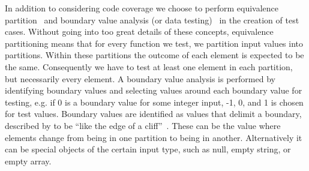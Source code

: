 In addition to considering code coverage we choose to perform equivalence partition~\cite[pp.~67-69]{Patton05} and boundary value analysis (or data testing)~\cite[pp.~70-79]{Patton05} in the creation of test cases.
Without going into too great details of these concepts, equivalence partitioning means that for every function we test, we partition input values into partitions.
Within these partitions the outcome of each element is expected to be the same.
Consequently we have to test at least one element in each partition, but necessarily every element.
A boundary value analysis is performed by identifying boundary values and selecting values around each boundary value for testing, e.g. if 0 is a boundary value for some integer input, -1, 0, and 1 is chosen for test values.
Boundary values are identified as values that delimit a boundary, described by \citeauthor{Patton05} to be ``like the edge of a cliff''~\cite[p.~71]{Patton05}.
These can be the value where elements change from being in one partition to being in another.
Alternatively it can be special objects of the certain input type, such as null, empty string, or empty array.